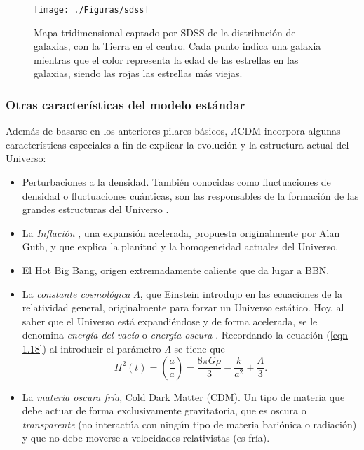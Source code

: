 \documentclass[a4paper,openright,10pt, oneside, final]{book}
\begin{document}
\begin{figure}
\centering
  \texttt{[image: ./Figuras/sdss]}
  \caption{\footnotesize{Mapa tridimensional captado por SDSS de la distribución de galaxias, con la Tierra en el centro. Cada punto indica una galaxia mientras que el color representa la edad de las estrellas en las galaxias, siendo las rojas las estrellas más viejas.}}
  \label{fig 1.5}
\end{figure}

\subsubsection*{Otras características del modelo estándar}
Además de basarse en los anteriores pilares básicos, $\Lambda$CDM incorpora algunas características especiales a fin de explicar la evolución y la estructura actual del Universo:
\begin{itemize}
\item Perturbaciones a la densidad. También conocidas como fluctuaciones de densidad o fluctuaciones cuánticas, son las responsables de la formación de las grandes estructuras del Universo \cite{1.2.3}.

\item La \textit{Inflación} \cite{1.2.1}, una expansión acelerada, propuesta originalmente por Alan Guth, y que explica la planitud y la homogeneidad actuales del Universo.

\item El Hot Big Bang, origen extremadamente caliente que da lugar a BBN.

\item La \textit{constante cosmológica} $\Lambda$, que Einstein introdujo en las ecuaciones de la relatividad general, originalmente para forzar un Universo estático. Hoy, al saber que el Universo está expandiéndose y de forma acelerada, se le denomina \textit{energía del vacío} o \textit{energía oscura} \cite{1.2.2}. Recordando la ecuación (\ref{eqn 1.18}) al introducir el parámetro $\Lambda$ se tiene que
\begin{equation}
H^{2}(t) = \left(\frac{\dot{a}}{a}\right)
= 
\frac{8 \pi G \rho}{3} - \frac{k}{a^{2}} + \frac{\Lambda}{3}.\label{eqn 1.43}
\end{equation}
\item La \textit{materia oscura fría}, Cold Dark Matter (CDM). Un tipo de materia que debe actuar de forma exclusivamente gravitatoria, que es oscura o \textit{transparente} (no interactúa con ningún tipo de materia bariónica o radiación) y que no debe moverse a velocidades relativistas (es fría).


\end{itemize}
\end{document}
